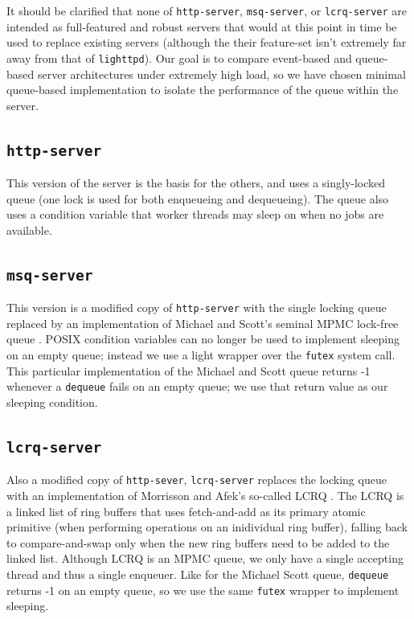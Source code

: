 \documentclass[twoside,10pt]{article}
\begin{document}
\begin{multicols}{2}
It should be clarified that none of \verb+http-server+,
\verb+msq-server+, or \verb+lcrq-server+ are intended as full-featured
and robust servers that would at this point in time be used to replace
existing servers (although the their feature-set isn't extremely far
away from that of \verb+lighttpd+). Our goal is to compare event-based
and queue-based server architectures under extremely high load, so we
have chosen minimal queue-based implementation to isolate the
performance of the queue within the server.

\subsection{\texttt{http-server}}

This version of the server is the basis for the others, and uses a
singly-locked queue (one lock is used for both enqueueing and
dequeueing). The queue also uses a condition variable that worker
threads may sleep on when no jobs are available.

\subsection{\texttt{msq-server}}

This version is a modified copy of \verb+http-server+ with the single
locking queue replaced by an implementation of Michael and Scott's
seminal MPMC lock-free queue \cite{synch-1.0.1}. POSIX
condition variables can no longer be used to implement sleeping on an
empty queue; instead we use a light wrapper over the \verb+futex+ system
call. This particular implementation of the Michael and Scott queue
returns -1 whenever a \verb+dequeue+ fails on an empty queue; we use that
return value as our sleeping condition.

\subsection{\texttt{lcrq-server}}

Also a modified copy of \verb+http-sever+, \verb+lcrq-server+ replaces
the locking queue with an implementation of Morrisson and Afek's
so-called LCRQ \cite{lcrq-source}. The LCRQ is a linked list of ring buffers that uses
fetch-and-add as its primary atomic primitive (when performing
operations on an inidividual ring buffer), falling back to
compare-and-swap only when the new ring buffers need to be added to
the linked list. Although LCRQ is an MPMC queue, we only have a single
accepting thread and thus a single enqueuer. Like for the Michael
Scott queue, \verb+dequeue+ returns -1 on an empty queue, so we use
the same \verb+futex+ wrapper to implement sleeping.


\end{multicols}
\end{document}
